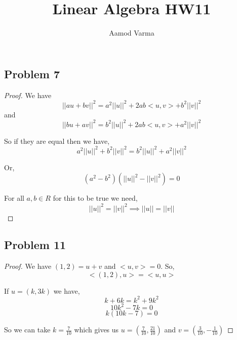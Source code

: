 \documentclass[a4paper]{report}
\title{Linear Algebra HW11}
\author{Aamod Varma}
\begin{document}
\maketitle
\date{}

\subsection*{Problem 7}
\begin{proof}
We have $$||au + bv||^2 = a^2||u||^2 + 2ab<u,v> + b^2||v||^2$$ and $$||bu + av||^2 = b^2||u||^2 + 2ab<u,v> + a^2||v||^2$$

So if they are equal then we have, 
$$ a^2||u||^2 + b^2||v||^2 = b^2||u||^2 +  a^2||v||^2$$ 

Or, 
$$ (a^2 - b^2) (||u||^2 - ||v||^2)  = 0$$  

For all $a,b \in R$ for this to be true we need, 
$$ ||u||^2 = ||v||^2 \implies ||u|| = ||v|| $$ 
\end{proof}

\subsection*{Problem 11}
\begin{proof}
   We have $(1,2)  = u + v$ and  $<u,v> = 0$. So,  
   $$ <(1,2),u> = <u,u> $$ 
   
   If $u = (k,3k)$ we have, 
   $$ k + 6k = k^2 + 9k^2 $$ 
   $$ 10k^2 - 7k = 0 $$ 
   $$ k(10k - 7) = 0 $$ 

   So we can take $k = \frac{7}{10}$ which gives us $u = (\frac{7}{10}, \frac{21}{10})$ and $v = (\frac{3}{10}, -\frac{1}{10})$
\end{proof}
\end{document}
